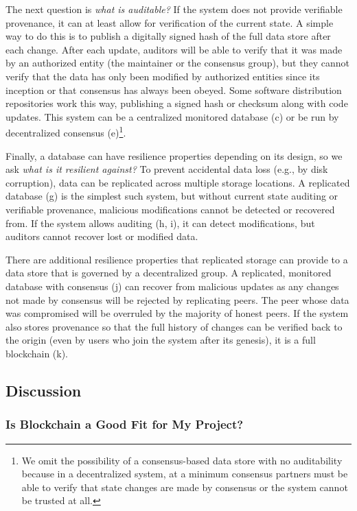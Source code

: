 {The next question is \emph{what is auditable?} If the system does not provide verifiable provenance, it can at least allow for verification of the current state. A simple way to do this is to publish a digitally signed hash of the full data store after each change. After each update, auditors will be able to verify that it was made by an authorized entity (the maintainer or the consensus group), but they cannot verify that the data has only been modified by authorized entities since its inception or that consensus has always been obeyed. Some software distribution repositories work this way, publishing a signed hash or checksum along with code updates. This system can be a centralized monitored database (c) or be run by decentralized consensus (e)\footnote{
	We omit the possibility of a consensus-based data store with no auditability because in a decentralized system, at a minimum consensus partners must be able to verify that state changes are made by consensus or the system cannot be trusted at all.
}. 

Finally, a database can have resilience properties depending on its design, so we ask \emph{what is it resilient against?} To prevent accidental data loss (e.g., by disk corruption), data can be replicated across multiple storage locations. A replicated database (g) is the simplest such system, but without current state auditing or verifiable provenance, malicious modifications cannot be detected or recovered from. If the system allows auditing (h, i), it can detect modifications, but auditors cannot recover lost or modified data. 

There are additional resilience properties that replicated storage can provide to a data store that is governed by a decentralized group. A replicated, monitored database with consensus (j) can recover from malicious updates as any changes not made by consensus will be rejected by replicating peers. The peer whose data was compromised will be overruled by the majority of honest peers. If the system also stores provenance so that the full history of changes can be verified back to the origin (even by users who join the system after its genesis), it is a full blockchain (k).

\subsection{Discussion}

\subsubsection{Is Blockchain a Good Fit for My Project?}

}

